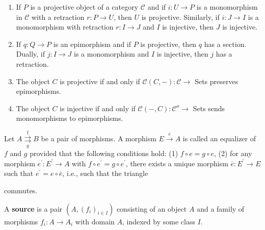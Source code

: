 \begin{example}
\begin{prop}
\begin{enumerate}
    \item If $P$ is a projective object of a category $\mathcal{C}$ and if $i: U \rightarrow P$ is a monomorphism in $\mathcal{C}$ with a retraction $r: P \rightarrow U$, then $U$ is projective. Similarly, if $i: J \rightarrow I$ is a monomorphism with retraction $r: I \rightarrow J$ and $I$ is injective, then $J$ is injective.    
    \item If $q: Q \rightarrow P$ is an epimorphism and if $P$ is projective, then $q$ has a section. Dually, if $j: I \rightarrow J$ is a monomorphism and $I$ is injective, then $j$ has a retraction.
    \item The object $C$ is projective if and only if $\mathcal{C}(C,-): \mathcal{C} \rightarrow$ Sets preserves epimorphisms. 
    \item The object $C$ is injective if and only if $\mathcal{C}(-, C): \mathcal{C}^o \rightarrow$ Sets sends monomorphisms to epimorphisms.
\end{enumerate}
\end{prop}




Let $A \stackrel{\text { f }}{\underset{g}{\rightrightarrows}} B$ be a pair of morphisms. A morphism $E \xrightarrow{e} A$ is called an equalizer of $f$ and $g$ provided that the following conditions hold:
(1) $f \circ e=g \circ e$,
(2) for any morphism $e^{\prime}: E^{\prime} \rightarrow A$ with $f \circ e^{\prime}=g \circ e^{\prime}$, there exists a unique morphism $\bar{e}: E^{\prime} \rightarrow E$ such that $e^{\prime}=e \circ \bar{e}$, i.e., such that the triangle
 commutes.
    

A \textbf{source} is a pair $\left(A,\left(f_i\right)_{i \in I}\right)$ consisting of an object $A$ and a family of morphisms $f_i: A \rightarrow A_i$ with domain $A$, indexed by some class $I$. 



\end{example}
